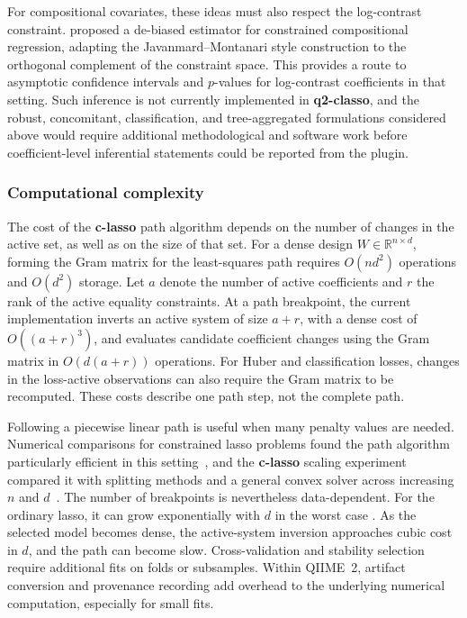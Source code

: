\documentclass[11pt,a4paper]{article}
\newcommand{\pkg}[1]{\textbf{#1}}
\newcommand{\R}{\mathbb{R}}
\begin{document}
For compositional covariates, these ideas must also respect the log-contrast
constraint. \citet{shi2016regression} proposed a de-biased estimator for
constrained compositional regression, adapting the Javanmard--Montanari style
construction to the orthogonal complement of the constraint space. This provides
a route to asymptotic confidence intervals and $p$-values for log-contrast
coefficients in that setting. Such inference is not currently implemented in
\pkg{q2-classo}, and the robust, concomitant, classification, and
tree-aggregated formulations considered above would require additional
methodological and software work before coefficient-level inferential statements
could be reported from the plugin.

\subsubsection{Computational complexity}
\label{sec:classo-complexity}

The cost of the \pkg{c-lasso} path algorithm depends on the number of changes
in the active set, as well as on the size of that set. For a dense design
$W\in\R^{n\times d}$, forming the Gram matrix for the least-squares path
requires $O(nd^2)$ operations and $O(d^2)$ storage. Let $a$ denote the number
of active coefficients and $r$ the rank of the active equality constraints.
At a path breakpoint, the current implementation inverts an active system of
size $a+r$, with a dense cost of $O((a+r)^3)$, and evaluates candidate
coefficient changes using the Gram matrix in $O(d(a+r))$ operations. For
Huber and classification losses, changes in the loss-active observations can
also require the Gram matrix to be recomputed. These costs describe one path
step, not the complete path.

Following a piecewise linear path is useful when many penalty values are
needed. Numerical comparisons for constrained lasso problems found the path
algorithm particularly efficient in this setting~\citep{gaines2018algorithms},
and the \pkg{c-lasso} scaling experiment compared it with splitting methods
and a general convex solver across increasing $n$ and $d$~\citep{Simpson2021}.
The number of breakpoints is nevertheless data-dependent. For the ordinary
lasso, it can grow exponentially with $d$ in the worst case
\citep{mairal2012complexity}. As the selected model becomes dense,
the active-system inversion approaches cubic cost in $d$, and the path can
become slow. Cross-validation and stability selection require additional fits
on folds or subsamples. Within QIIME~2, artifact conversion and provenance
recording add overhead to the underlying numerical computation, especially
for small fits.
\end{document}

